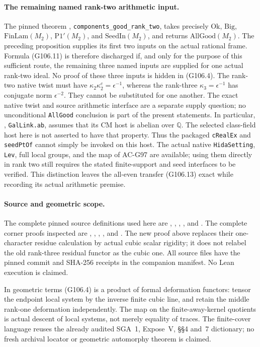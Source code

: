 \paragraph{The remaining named rank-two arithmetic input.}
The pinned theorem ,
\texttt{components\_good\_rank\_two}, takes precisely
\(\mathrm{Ok}\), \(\mathrm{Big}\), \(\mathrm{FinLam}(M_2)\),
\(\mathrm{P1'}(M_2)\), and \(\mathrm{SeedIn}(M_2)\), and
returns \(\mathrm{AllGood}(M_2)\).
The preceding proposition supplies its first two inputs on the
actual rational frame.  Formula (G106.11) is therefore discharged
if, and only for the purpose of this sufficient route, the remaining
three named inputs are supplied for one actual rank-two ideal.
No proof of these three inputs is hidden in (G106.4).
The rank-two native twist must have
\(\kappa_2\kappa_2^c=\epsilon^{-1}\), whereas the rank-three
\(\kappa_3=\epsilon^{-1}\) has conjugate norm \(\epsilon^{-2}\).
They cannot be substituted for one another.
The exact native twist and source arithmetic interface are a separate
supply question; no unconditional \texttt{AllGood} conclusion is
part of the present statements.  In particular,
, \texttt{GalLink.ab}, assumes that its CM
host is abelian over \(\mathbb Q\).  The selected class-field host
here is not asserted to have that property.  Thus the packaged
\texttt{cRealEx} and \texttt{seedPtOf} cannot simply be invoked on
this host.  The actual native \texttt{HidaSetting}, \texttt{Lev},
full local groups, and the map of AC-G97 are available; using them
directly in rank two still requires the stated finite-support and
seed interfaces to be verified.  This distinction leaves the
all-even transfer (G106.13) exact while recording its actual
arithmetic premise.

\paragraph{Source and geometric scope.}
The complete pinned source definitions used here are
, ,
, , and
.
The complete corner proofs inspected are
,
,
,
, and
.
The new proof above replaces their one-character residue calculation
by actual cubic scalar rigidity; it does not relabel the old
rank-three residual functor as the cubic one.
All source files have the pinned commit and SHA-256 receipts in the
companion manifest.  No Lean execution is claimed.

In geometric terms (G106.4) is a product of formal deformation
functors: tensor the endpoint local system by the inverse finite
cubic line, and retain the middle rank-one deformation independently.
The map on the finite-away-kernel quotients is actual descent of
local systems, not merely equality of traces.  The finite-cover
language reuses the already audited SGA~1, Expose~V, \S\S4 and~7
dictionary; no fresh archival locator or geometric automorphy theorem
is claimed.
